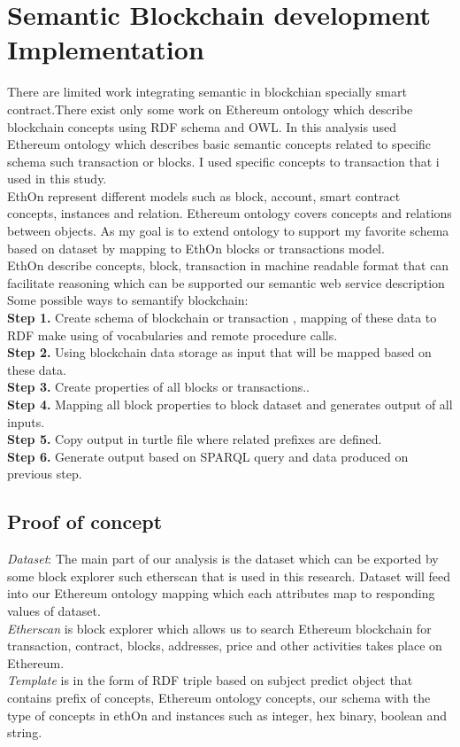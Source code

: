 \section{Semantic Blockchain development Implementation}
There are limited work integrating semantic in blockchian specially smart contract.There exist only some work on Ethereum ontology which describe blockchain concepts using RDF schema and OWL. In this analysis used Ethereum ontology which describes basic semantic concepts related to specific schema such transaction or blocks. I used specific concepts to transaction that i used in this study.\\
EthOn represent different models such as block, account, smart contract concepts, instances and relation.
Ethereum ontology covers concepts and relations between objects. As my goal is to extend ontology to support my favorite schema based on dataset by mapping to EthOn blocks or transactions model.\\
EthOn describe concepts, block, transaction in machine readable format that can facilitate reasoning which can be supported our semantic web service description
Some possible ways to semantify blockchain:\\
\textbf{Step 1.} Create schema of blockchain or transaction , mapping of these data to RDF make using of vocabularies and remote procedure calls.\\
\textbf{Step 2.} Using blockchain data storage as input that will be mapped based on these data.\\
\textbf{Step 3.} Create properties of all blocks or transactions..\\
\textbf{Step 4.} Mapping all block properties to block dataset and generates output of all inputs.\\
\textbf{Step 5.} Copy output in turtle file where related prefixes are defined.\\
\textbf{Step 6.} Generate output based on SPARQL query and  data produced on previous step.\\

\subsection{Proof of concept}
\textit{Dataset}: The main part of our analysis is the dataset which can be exported by some block explorer such etherscan that is used in this research. Dataset will feed into our Ethereum ontology mapping which each attributes map to responding values of dataset.\\
\textit{Etherscan} is block explorer which allows us to search Ethereum blockchain for transaction, contract, blocks, addresses, price and other activities takes place on Ethereum.\\
\textit{Template} is in the form of RDF triple based on subject predict object that contains prefix of concepts, Ethereum ontology concepts, our schema with the type of concepts in ethOn and instances such as integer, hex binary, boolean and string.\\

